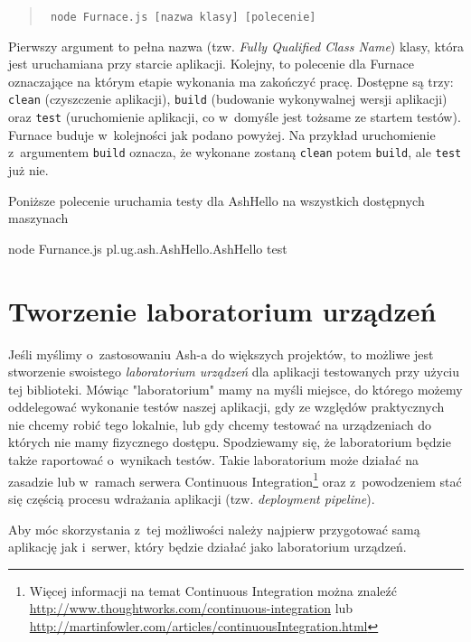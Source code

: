 \documentclass[brudnopis]{xmgr}
\begin{document}
\begin{quote}
	\texttt{ node Furnace.js [nazwa klasy] [polecenie] }
\end{quote}

Pierwszy argument to pełna nazwa (tzw. \textit{Fully Qualified Class Name}) klasy, która jest uruchamiana przy starcie aplikacji.  Kolejny, to polecenie dla Furnace oznaczające na którym etapie wykonania ma zakończyć pracę. Dostępne są trzy: \texttt{clean} (czyszczenie aplikacji), \texttt{build} (budowanie wykonywalnej wersji aplikacji) oraz \texttt{test} (uruchomienie aplikacji, co w~domyśle jest tożsame ze startem testów). Furnace buduje w~kolejności jak podano powyżej. Na przykład uruchomienie z~argumentem \texttt{build} oznacza, że wykonane zostaną \texttt{clean} potem \texttt{build}, ale \texttt{test} już nie.

Poniższe polecenie uruchamia testy dla AshHello na wszystkich dostępnych maszynach 

\begin{javascriptcode}
	node Furnance.js pl.ug.ash.AshHello.AshHello test
\end{javascriptcode}

\section{Tworzenie laboratorium urządzeń}

Jeśli myślimy o~zastosowaniu Ash-a do większych projektów, to możliwe jest stworzenie swoistego \textit{laboratorium urządzeń} dla aplikacji testowanych przy użyciu tej biblioteki. Mówiąc "laboratorium" mamy na myśli miejsce, do którego możemy oddelegować wykonanie testów naszej aplikacji, gdy ze względów praktycznych nie chcemy robić tego lokalnie, lub gdy chcemy testować na urządzeniach do których nie mamy fizycznego dostępu. Spodziewamy się, że laboratorium będzie także raportować o~wynikach testów. Takie laboratorium może działać na zasadzie lub w~ramach serwera Continuous Integration\footnote{ Więcej informacji na temat Continuous Integration można znaleźć \url{http://www.thoughtworks.com/continuous-integration} lub \url{http://martinfowler.com/articles/continuousIntegration.html} } oraz z~powodzeniem stać się częścią procesu wdrażania aplikacji (tzw. \textit{deployment pipeline}).

Aby móc skorzystania z~tej możliwości należy najpierw przygotować samą aplikację jak i~serwer, który będzie działać jako laboratorium urządzeń. 
\end{document}

